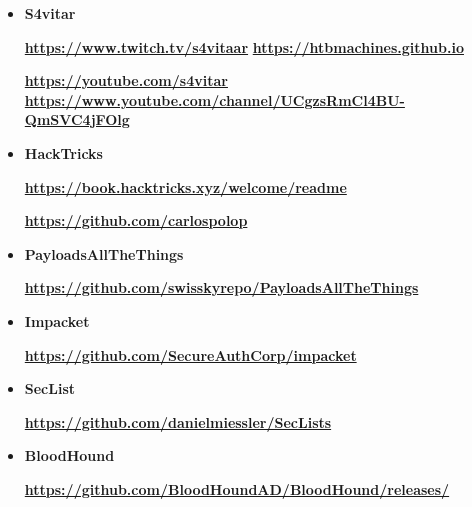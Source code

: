 \begin{itemize}
\item \textbf{S4vitar}
    \par 
      \href{https://www.twitch.tv/s4vitaar}{\textbf{\color{blue}https://www.twitch.tv/s4vitaar}}
    \hspace{0.2cm}
      \href{https://htbmachines.github.io}{\textbf{\color{blue}https://htbmachines.github.io}}
    \par
      \href{https://youtube.com/s4vitar}{\textbf{\color{blue}https://youtube.com/s4vitar}}
    \hspace{0.2cm}
      \href{https://www.youtube.com/channel/UCgzsRmCl4BU-QmSVC4jFOlg}{\textbf{\color{blue}https://www.youtube.com/channel/UCgzsRmCl4BU-QmSVC4jFOlg}}
    
  
\item \textbf{HackTricks}
    \par 
      \href{https://book.hacktricks.xyz/welcome/readme}{\textbf{\color{blue}https://book.hacktricks.xyz/welcome/readme}}
    \par
      \href{https://github.com/carlospolop}{\textbf{\color{blue}https://github.com/carlospolop}}
    
  
\item \textbf{PayloadsAllTheThings}

    \par 
      \href{https://github.com/swisskyrepo/PayloadsAllTheThings}{\textbf{\color{blue}https://github.com/swisskyrepo/PayloadsAllTheThings}}
    
  
\item \textbf{Impacket}

    \par 
      \href{https://github.com/SecureAuthCorp/impacket}{\textbf{\color{blue}https://github.com/SecureAuthCorp/impacket}}
    
  
\item \textbf{SecList}

    \par 
      \href{https://github.com/danielmiessler/SecLists}{\textbf{\color{blue}https://github.com/danielmiessler/SecLists}}
    
  
\item \textbf{BloodHound}

    \par 
      \href{https://github.com/BloodHoundAD/BloodHound/releases/}{\textbf{\color{blue}https://github.com/BloodHoundAD/BloodHound/releases/}}
    

\end{itemize}
